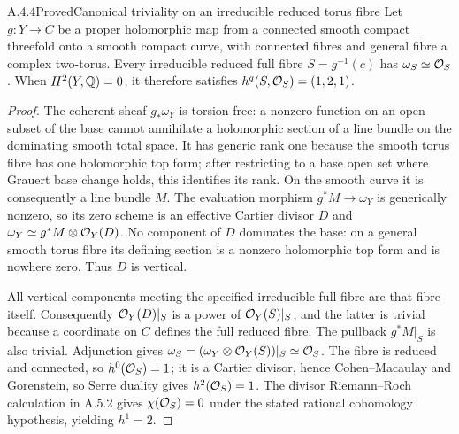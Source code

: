 
\begin{statement}{A.4.4}{Proved}{Canonical triviality on an irreducible reduced torus fibre}
Let $g:Y\to C$ be a proper holomorphic map from a connected smooth compact threefold onto a smooth compact curve, with connected fibres and general fibre a complex two-torus. Every irreducible reduced full fibre $S=g^{-1}(c)$ has $\omega_S\simeq\mathcal O_S$. When $H^2(Y,\mathbb Q)=0$, it therefore satisfies $h^q(S,\mathcal O_S)=(1,2,1)$.
\end{statement}
\begin{proof}
The coherent sheaf $g_*\omega_Y$ is torsion-free: a nonzero function on an open subset of the base cannot annihilate a holomorphic section of a line bundle on the dominating smooth total space. It has generic rank one because the smooth torus fibre has one holomorphic top form; after restricting to a base open set where Grauert base change holds, this identifies its rank. On the smooth curve it is consequently a line bundle $M$. The evaluation morphism $g^*M\to\omega_Y$ is generically nonzero, so its zero scheme is an effective Cartier divisor $D$ and $\omega_Y\simeq g^*M\otimes\mathcal O_Y(D)$. No component of $D$ dominates the base: on a general smooth torus fibre its defining section is a nonzero holomorphic top form and is nowhere zero. Thus $D$ is vertical.

All vertical components meeting the specified irreducible full fibre are that fibre itself. Consequently $\mathcal O_Y(D)|_S$ is a power of $\mathcal O_Y(S)|_S$, and the latter is trivial because a coordinate on $C$ defines the full reduced fibre. The pullback $g^*M|_S$ is also trivial. Adjunction gives $\omega_S=(\omega_Y\otimes\mathcal O_Y(S))|_S\simeq\mathcal O_S$. The fibre is reduced and connected, so $h^0(\mathcal O_S)=1$; it is a Cartier divisor, hence Cohen--Macaulay and Gorenstein, so Serre duality gives $h^2(\mathcal O_S)=1$. The divisor Riemann--Roch calculation in A.5.2 gives $\chi(\mathcal O_S)=0$ under the stated rational cohomology hypothesis, yielding $h^1=2$.
\end{proof}



